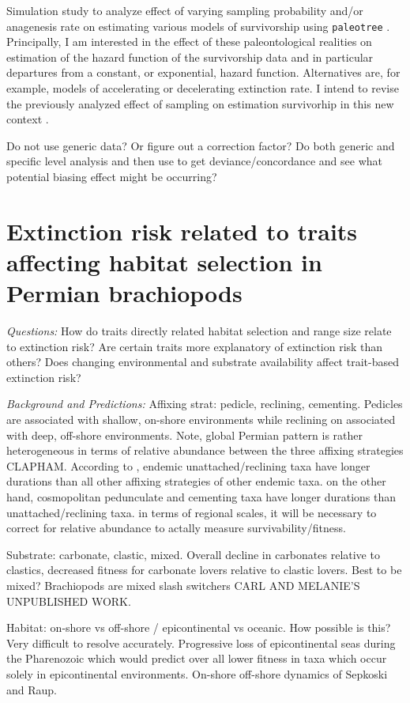 \documentclass[12pt,letterpaper]{article}
\begin{document}
Simulation study to analyze effect of varying sampling probability and/or anagenesis rate on estimating various models of survivorship using \texttt{paleotree} \citep{Bapst2012a}. Principally, I am interested in the effect of these paleontological realities on estimation of the hazard function of the survivorship data and in particular departures from a constant, or exponential, hazard function. Alternatives are, for example, models of accelerating or decelerating extinction rate. I intend to revise the previously analyzed effect of sampling on estimation survivorhip in this new context \citep{Sepkoski1975}.

Do not use generic data? Or figure out a correction factor? Do both generic and specific level analysis and then use \citep{Foote1988} to get deviance/concordance and see what potential biasing effect might be occurring?


\section{Extinction risk related to traits affecting habitat selection in Permian brachiopods}

\textit{Questions:} How do traits directly related habitat selection and range size relate to extinction risk? Are certain traits more explanatory of extinction risk than others? Does changing environmental and substrate availability affect trait-based extinction risk?

\textit{Background and Predictions:}
Affixing strat: pedicle, reclining, cementing. Pedicles are associated with shallow, on-shore environments while reclining on associated with deep, off-shore environments. Note, global Permian pattern is rather heterogeneous in terms of relative abundance between the three affixing strategies CLAPHAM. According to \citet{Alexander1977}, endemic unattached/reclining taxa have longer durations than all other affixing strategies of other endemic taxa. on the other hand, cosmopolitan pedunculate and cementing taxa have longer durations than unattached/reclining taxa. in terms of regional scales, it will be necessary to correct for relative abundance to actally measure survivability/fitness.

Substrate: carbonate, clastic, mixed. Overall decline in carbonates relative to clastics, decreased fitness for carbonate lovers relative to clastic lovers. Best to be mixed? Brachiopods are mixed slash switchers CARL AND MELANIE'S UNPUBLISHED WORK.

Habitat: on-shore vs off-shore / epicontinental vs oceanic. How possible is this? Very difficult to resolve accurately. Progressive loss of epicontinental seas during the Pharenozoic which would predict over all lower fitness in taxa which occur solely in epicontinental environments. On-shore off-shore dynamics of Sepkoski and Raup.
\end{document}
